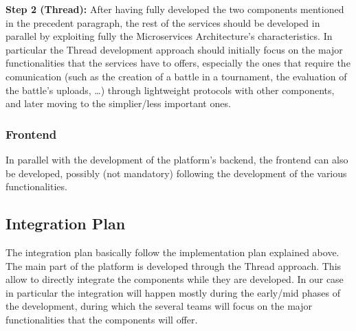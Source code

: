\documentclass{article}
\begin{document}
{        \textbf{Step 2 (Thread):} After having fully developed the two components mentioned in the
        precedent paragraph, the rest of the services should be developed in parallel by exploiting 
        fully the Microservices Architecture's characteristics. In particular the Thread
        development approach should initially focus on the major functionalities that the services
        have to offers, especially the ones that require the comunication (such as the creation
        of a battle in a tournament, the evaluation of the battle's uploads, \dots) through 
        lightweight protocols with other components, and later moving to the simplier/less 
        important ones.

        \subsubsection{Frontend}
        In parallel with the development of the platform's backend, the frontend can also be
        developed, possibly (not mandatory) following the development of the various 
        functionalities.    

    \subsection{Integration Plan}
        The integration plan basically follow the implementation plan explained above.
        The main part of the platform is developed through the Thread approach. This allow to
        directly integrate the components while they are developed.
        In our case in particular the integration will happen mostly during the early/mid phases
        of the development, during which the several teams will focus on the major functionalities
        that the components will offer.

}
\end{document}
